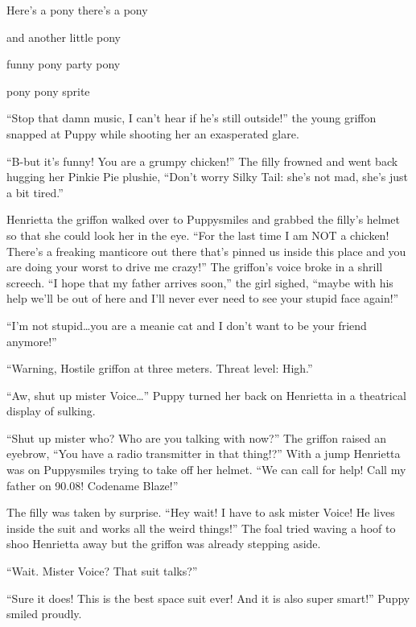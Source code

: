 \begin{song}
    Here's a pony there's a pony
    
    and another little pony
    
    funny pony party pony
    
    pony pony sprite
\end{song}

\horizonline


``Stop that damn music, I can't hear if he's still outside!'' the young griffon snapped at Puppy while shooting her an exasperated glare.

``B-but it's funny! You are a grumpy chicken!'' The filly frowned and went back hugging her Pinkie Pie plushie, ``Don't worry Silky Tail: she's not mad, she's just a bit tired.''

Henrietta the griffon walked over to Puppysmiles and grabbed the filly's helmet so that she could look her in the eye. ``For the last time I am NOT a chicken! There's a freaking manticore out there that's pinned us inside this place and you are doing your worst to drive me crazy!'' The griffon's voice broke in a shrill screech. ``I hope that my father arrives soon,'' the girl sighed, ``maybe with his help we'll be out of here and I'll never ever need to see your stupid face again!''

``I'm not stupid\dots you are a meanie cat and I don't want to be your friend anymore!''

``{\mt Warning, Hostile griffon at three meters. Threat level: High.}''

``Aw, shut up mister Voice\dots'' Puppy turned her back on Henrietta in a theatrical display of sulking.

``Shut up mister who? Who are you talking with now?'' The griffon raised an eyebrow, ``You have a radio transmitter in that thing!?'' With a jump Henrietta was on Puppysmiles trying to take off her helmet. ``We can call for help! Call my father on 90.08! Codename Blaze!''

The filly was taken by surprise. ``Hey wait! I have to ask mister Voice! He lives inside the suit and works all the weird things!'' The foal tried waving a hoof to shoo Henrietta away but the griffon was already stepping aside.

``Wait. Mister Voice? That suit talks?''

``Sure it does! This is the best space suit ever! And it is also super smart!'' Puppy smiled proudly.

